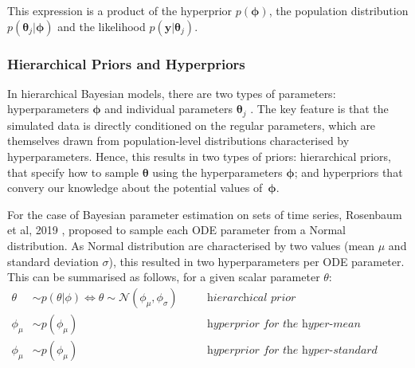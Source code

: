 \documentclass[11pt]{article}
\begin{document}
This expression is a product of the hyperprior $p(\boldsymbol{\phi})$, the population distribution $p(\boldsymbol{\theta}_j|\boldsymbol{\phi})$ and the likelihood $p(\boldsymbol{y}|\boldsymbol{\theta}_j)$.

\subsubsection{Hierarchical Priors and Hyperpriors}\label{sec:hierPriorsAndHyper}
In hierarchical Bayesian models, there are two types of parameters: hyperparameters $\boldsymbol{\phi}$ and individual parameters $\boldsymbol{\theta}_j$ \cite{tbk_gelman}. The key feature is that the simulated data is directly conditioned on the regular parameters, which are themselves drawn from population-level distributions characterised by hyperparameters. Hence, this results in two types of priors: hierarchical priors, that specify how to sample $\boldsymbol{\theta}$ using the hyperparameters $\boldsymbol{\phi}$; and hyperpriors that convery our knowledge about the potential values of~$\boldsymbol{\phi}$.

For the case of Bayesian parameter estimation on sets of time series, Rosenbaum et al, 2019 \cite{rosenbaum}, proposed to sample each ODE parameter from a Normal distribution. As Normal distribution are characterised by two values (mean $\mu$ and standard deviation $\sigma$), this resulted in two hyperparameters per ODE parameter. This can be summarised as follows, for a given scalar parameter $\theta$:
\begin{align*}
    \theta &\sim p(\theta | \phi) \Leftrightarrow \theta \sim \mathcal{N}(\phi_\mu, \phi_\sigma) \quad &&\textit{hierarchical prior} \\ 
    \phi_\mu &\sim p(\phi_\mu) \quad &&\textit{hyperprior for the hyper-mean} \\ 
    \phi_\mu &\sim p(\phi_\mu) \quad &&\textit{hyperprior for the hyper-standard deviation} 
\end{align*}
\end{document}

